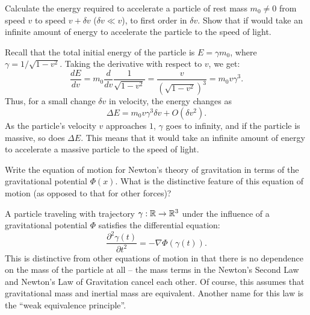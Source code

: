 \documentclass{../../templates/lkx_pset}
\begin{document}
\begin{problem}{4}
Calculate the energy required to accelerate a particle of rest mass $m_0\neq 0$ from speed $v$ to speed $v+\delta v$ ($\delta v \ll v$), to first order in $\delta v$. Show that if would take an infinite amount of energy to accelerate the particle to the speed of light.
\end{problem}
\begin{solution}
  Recall that the total initial energy of the particle is $E = \gamma m_0$, where $\gamma=1/\sqrt{1-v^2}$. Taking the derivative with respect to $v$, we get:
  \[
    \frac{d E}{d v} = m_0\frac{d}{dv}\frac{1}{\sqrt{1-v^2}} = \frac{v}{(\sqrt{1-v^2})^3} = m_0v\gamma^3.
  \]
  Thus, for a small change $\delta v$ in velocity, the energy changes as
  \[
    \Delta E = m_0 v\gamma^3 \delta v + O(\delta v^2).
  \]
  As the particle's velocity $v$ approaches $1$, $\gamma$ goes to infinity, and if the particle is massive, so does $\Delta E$. This means that it would take an infinite amount of energy to accelerate a massive particle to the speed of light.
\end{solution}

\begin{problem}{5}
Write the equation of motion for Newton's theory of gravitation in terms of the gravitational potential $\Phi(x)$. What is the distinctive feature of this equation of motion (as opposed to that for other forces)?
\end{problem}
\begin{solution}
	A particle traveling with trajectory $\gamma : \mathbb{R} \to \mathbb{R}^3$ under the influence of a gravitational potential $\Phi$ satisfies the differential equation:
	\[
		\frac{\partial^2 \gamma(t)}{\partial t^2} = -\nabla \Phi(\gamma(t)).
	\]
	This is distinctive from other equations of motion in that there is no dependence on the mass of the particle at all -- the mass terms in the Newton's Second Law and Newton's Law of Gravitation cancel each other. Of course, this assumes that gravitational mass and inertial mass are equivalent. Another name for this law is the ``weak equivalence principle''.

\end{solution}
\end{document}
